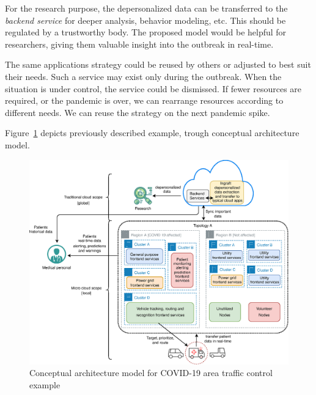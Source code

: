 For the research purpose, the depersonalized data can be transferred to the \emph{backend service} for deeper analysis, behavior modeling, etc. This should be regulated by a trustworthy body. The proposed model would be helpful for researchers, giving them valuable insight into the outbreak in real-time. 

The same applications strategy could be reused by others or adjusted to best suit their needs. Such a service may exist only during the outbreak. When the situation is under control, the service could be dismissed. If fewer resources are required, or the pandemic is over, we can rearrange resources according to different needs. We can reuse the strategy on the next pandemic spike.

Figure~\ref{fig:fig25} depicts previously described example, trough conceptual architecture model.

\begin{figure}[H]
	\begin{center}
		\includegraphics[width=\columnwidth]{images/Figure25}
	\end{center}
	\vspace{-0.5cm}
	\caption{Conceptual architecture model for COVID-19 area traffic control example}
	\label{fig:fig25}
\end{figure}
%
%